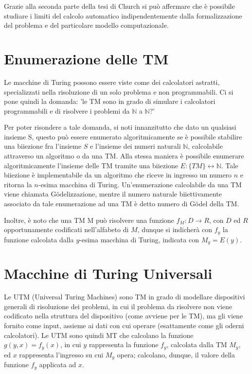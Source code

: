   Grazie alla seconda parte della tesi di Church si può affermare che è possibile studiare i limiti del calcolo automatico indipendentemente dalla formalizzazione del problema e del particolare modello computazionale.

  \section{Enumerazione delle TM}
  Le macchine di Turing possono essere viste come dei calcolatori astratti, specializzati nella risoluzione di un solo problema e non programmabili. Ci si pone quindi la domanda: 'le TM sono in grado di simulare i calcolatori programmabili e di risolvere i problemi da \(\mathbb{N}\) a \(\mathbb{N}\)?'

  Per poter risondere a tale domanda, si noti innanzitutto che dato un qualsiasi insieme S, questo può essere enumerato algoritmicamente se è possibile stabilire una biiezione fra l'insieme \(S\) e l'insieme dei numeri naturali \(\mathbb{N}\), calcolabile attraverso un algoritmo o da una TM.
  Alla stessa maniera è possibile enumerare algoritmicamente l'insieme delle TM tramite una biiezione \(E:\{TM\}\leftrightarrow\mathbb{N}\). Tale biiezione è implementabile da un algoritmo che riceve in ingresso un numero \(n\) e ritorna la \(n\)-esima macchina di Turing. Un'enumerazione calcolabile da una TM viene chiamata Gödelizzazione, mentre il numero naturale biiettivamente associato da tale enumerazione ad una TM è detto numero di Gödel della TM. 

  Inoltre, è noto che una TM M può risolvere una funzione \(f_M:D\to R\), con \(D\) ed \(R\) opportunamente codificati nell'alfabeto di \(M\), dunque si indicherà con \(f_y\) la funzione calcolata dalla \(y\)-esima macchina di Turing, indicata con \(M_y=E(y)\).

  \section{Macchine di Turing Universali}
  Le UTM (Universal Turing Machines) sono TM in grado di modellare dispositivi generali di risoluzione dei problemi, in cui il problema da risolvere non viene codificato nella struttura del dispositivo (come avviene per le TM), ma gli viene fornito come input, assieme ai dati con cui operare (esattamente come gli oderni calcolatori). Le UTM sono quindi MT che calcolano la funzione \(g(y,x)=f_y(x)\), in cui \(y\) rappresenta la funzione \(f_y\), calcolata dalla TM \(M_y\), ed \(x\) rappresenta l'ingresso su cui \(M_y\) opera; calcolano, dunque, il valore della funzione \(f_y\) applicata ad \(x\).

